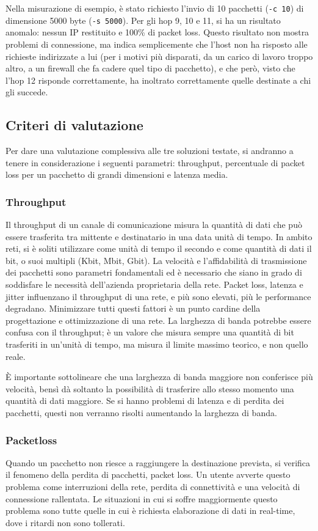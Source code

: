 Nella misurazione di esempio, è stato richiesto l'invio di 10 pacchetti (\texttt{-c 10}) di dimensione 5000 byte (\texttt{-s 5000}).
Per gli hop 9, 10 e 11, si ha un risultato anomalo: nessun IP restituito e 100\% di packet loss.
Questo risultato non mostra problemi di connessione, ma indica semplicemente che l'host non ha risposto alle richieste indirizzate a lui (per i motivi più disparati, da un carico di lavoro troppo altro, a un firewall che fa cadere quel tipo di pacchetto), e che però, visto che l'hop 12 risponde correttamente, ha inoltrato correttamente quelle destinate a chi gli succede.

\subsection{Criteri di valutazione}
Per dare una valutazione complessiva alle tre soluzioni testate, si andranno a tenere in considerazione i seguenti parametri: throughput, percentuale di packet loss per un pacchetto di grandi dimensioni e latenza media.

\subsubsection{Throughput}
Il throughput di un canale di comunicazione misura la quantità di dati che può essere trasferita tra mittente e destinatario in una data unità di tempo. In ambito reti, si è soliti utilizzare come unità di tempo il secondo e come quantità di dati il bit, o suoi multipli (Kbit, Mbit, Gbit).
La velocità e l'affidabilità di trasmissione dei pacchetti sono parametri fondamentali ed è necessario che siano in grado di soddisfare le necessità dell'azienda proprietaria della rete. Packet loss, latenza e jitter influenzano il throughput di una rete, e più sono elevati, più le performance degradano. Minimizzare tutti questi fattori è un punto cardine della progettazione e ottimizzazione di una rete.
La larghezza di banda potrebbe essere confusa con il throughput; è un valore che misura sempre una quantità di bit trasferiti in un'unità di tempo, ma misura il limite massimo teorico, e non quello reale.

È importante sottolineare che una larghezza di banda maggiore non conferisce più velocità, bensì dà soltanto la possibilità di trasferire allo stesso momento una quantità di dati maggiore. Se si hanno problemi di latenza e di perdita dei pacchetti, questi non verranno risolti aumentando la larghezza di banda.


\subsubsection{Packetloss}
Quando un pacchetto non riesce a raggiungere la destinazione prevista, si verifica il fenomeno della perdita di pacchetti, packet loss.
Un utente avverte questo problema come interruzioni della rete, perdita di connettività e una velocità di connessione rallentata.
Le situazioni in cui si soffre maggiormente questo problema sono tutte quelle in cui è richiesta elaborazione di dati in real-time, dove i ritardi non sono tollerati.

